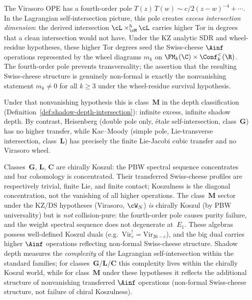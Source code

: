 \begin{remark}
The Virasoro OPE has a fourth-order pole
$T(z)\,T(w) \sim c/2(z-w)^{-4} + \cdots$.
In the Lagrangian self-intersection picture, this pole
creates \emph{excess intersection dimension}: the derived
intersection
$\cL \times_{\cM}^h \cL$ carries higher Tor in degrees that
a clean intersection would not have. Under the KZ analytic SDR and
wheel-residue hypotheses, these higher Tor degrees seed the
Swiss-cheese $\Ainf$ operations represented by the wheel diagrams
$m_k$ on $\FM_k(\C) \times \Conf_k^{<}(\R)$. The fourth-order pole
prevents transversality; the assertion that the resulting
Swiss-cheese structure is genuinely non-formal is exactly the
nonvanishing statement $m_k \ne 0$ for all $k \ge 3$ under the
wheel-residue survival hypothesis.

Under that nonvanishing hypothesis this is class~$\mathbf{M}$ in the
depth classification
(Definition~\ref{def:shadow-depth-intersection}): infinite
excess, infinite shadow depth. By contrast, Heisenberg
(double pole only, \'etale self-intersection, class~$\mathbf{G}$)
has no higher transfer, while Kac--Moody (simple pole,
Lie-transverse intersection, class~$\mathbf{L}$) has precisely the
finite Lie-Jacobi cubic transfer and no Virasoro wheel.

Classes~$\mathbf{G}$, $\mathbf{L}$, $\mathbf{C}$ are
chirally Koszul: the PBW spectral sequence concentrates
and bar cohomology is concentrated. Their transferred
Swiss-cheese profiles are respectively trivial, finite Lie, and finite
contact; Koszulness is the diagonal concentration, not the vanishing of
all higher operations.
The class~$\mathbf{M}$ sector under the KZ/DS hypotheses
(Virasoro, $\cW_N$) \emph{is}
chirally Koszul (by PBW universality) but is \emph{not}
collision-pure: the fourth-order pole causes purity
failure, and the weight spectral sequence does not
degenerate at~$E_1$. These algebras possess well-defined
Koszul duals (e.g.\ $\mathrm{Vir}_c^! = \mathrm{Vir}_{26-c}$),
and the big dual carries higher $\Ainf$ operations
reflecting non-formal Swiss-cheese structure.
Shadow depth measures the \emph{complexity} of the
Lagrangian self-intersection within the standard
families; for classes~$\mathbf{G}$/$\mathbf{L}$/$\mathbf{C}$
this complexity lives within the chirally Koszul world,
while for class~$\mathbf{M}$ under these hypotheses it reflects the additional
structure of nonvanishing transferred $\Ainf$ operations
(non-formal Swiss-cheese structure, not failure of chiral
Koszulness).
\end{remark}

